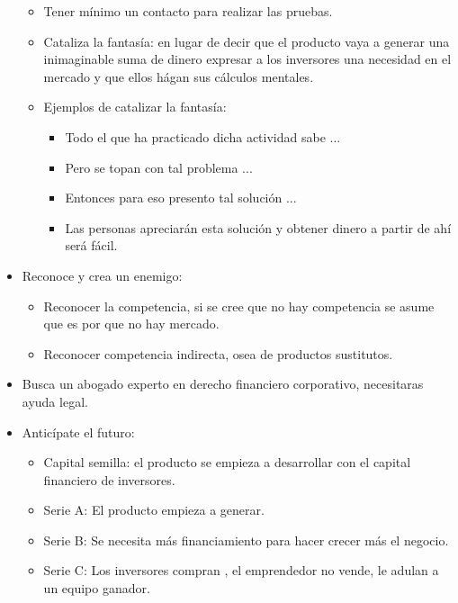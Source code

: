 \documentclass{article}
\begin{document}
\begin{itemize}
\begin{itemize}
            \item Tener mínimo un contacto para realizar las pruebas.
            \item Cataliza la fantasía: en lugar de decir que el producto vaya a generar una inimaginable suma de dinero expresar a los inversores una necesidad en el mercado y que ellos hágan sus cálculos mentales.
            \item Ejemplos de catalizar la fantasía:
                \begin{itemize}
                    \item Todo el que ha practicado dicha actividad sabe ... 
                    \item Pero se topan con tal problema ... 
                    \item Entonces para eso presento tal solución ... 
                    \item Las personas apreciarán esta solución y obtener dinero a partir de ahí será fácil.
                \end{itemize}
        \end{itemize}
    
    \item Reconoce y crea un enemigo:
        \begin{itemize}
            \item Reconocer la competencia, si se cree que no hay competencia se asume que es por que no hay mercado.
            \item Reconocer competencia indirecta, osea de productos sustitutos.
        \end{itemize}
    
    \item Busca un abogado experto en derecho financiero corporativo, necesitaras ayuda legal.
    \item Anticípate el futuro:
        \begin{itemize}
            \item Capital semilla: el producto se empieza a desarrollar con el capital financiero de inversores.
            \item Serie A: El producto empieza a generar.
            \item Serie B: Se necesita más financiamiento para hacer crecer más el negocio.
            \item Serie C: Los inversores compran , el emprendedor no vende, le adulan a un equipo ganador.
        \end{itemize}
    

\end{itemize}
\end{document}
